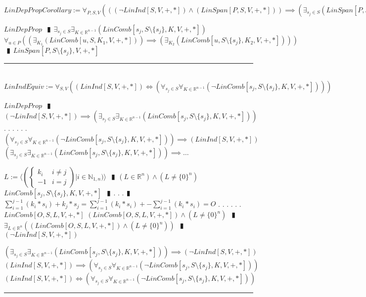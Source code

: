 \documentclass{book}
\newcommand{\abr}{:=}
\newcommand{\cont}{\phantom{.}. . .\phantom{.}}
\newcommand{\pipe}{$\phantom{(}\vrectangleblack\phantom{)}$}
\newcommand{\pr}[1]{\left(#1\right)}
\begin{document}
$LinDepPropCorollary \abr \forall_{P, S, V}\pr{\pr{(\lnot LinInd[S, V, +, *]) \land (LinSpan[P, S, V, +, *])} \implies \pr{\exists_{s_j \in S}(LinSpan[P, S \setminus \{s_j\}, V, +, *])}}$
\begin{enumerate}
  \lit $LinDepProp$ \pipe $\exists_{s_j \in S} \exists_{K \in \mathbb{R}^{n - 1}}(LinComb[s_j, S \setminus \{s_j\}, K, V, +, *])$
  \lit $\forall_{u \in P}\pr{\pr{\exists_{K_1}(LinComb[u, S, K_1, V, +, *])} \implies \pr{\exists_{K_2}(LinComb[u, S \setminus \{s_j\}, K_2, V, +, *])}}$ \pipe $LinSpan[P, S \setminus \{s_j\}, V, +, *]$
\end{enumerate} \vspace{.75mm} \hrule \vspace{.75mm} \ \\ 

$LinIndEquiv \abr \forall_{S, V}\pr{(LinInd[S, V, +, *]) \iff \pr{\forall_{s_j \in S} \forall_{K \in \mathbb{R}^{n - 1}}(\lnot LinComb[s_j, S \setminus \{s_j\}, K, V, +, *])}}$
\begin{enumerate}
  \lit $LinDepProp$ \pipe $(\lnot LinInd[S, V, +, *]) \implies \pr{\exists_{s_j \in S} \exists_{K \in \mathbb{R}^{n - 1}}(LinComb[s_j, S \setminus \{s_j\}, K, V, +, *])}$ \cont
  \lit \cont $\pr{\forall_{s_j \in S} \forall_{K \in \mathbb{R}^{n - 1}}(\lnot LinComb[s_j, S \setminus \{s_j\}, K, V, +, *])} \implies (LinInd[S, V, +, *])$
  \lit $\pr{\exists_{s_j \in S} \exists_{K \in \mathbb{R}^{n - 1}}(LinComb[s_j, S \setminus \{s_j\}, K, V, +, *])} \implies \ldots$
  \begin{enumerate}
    \lit $L \abr \langle \left(\begin{cases} 
      k_i & i \neq j \\
      -1 & i = j 
    \end{cases}\right) | i \in \mathbb{N}_{1, n}) \rangle$ \pipe $(L \in \mathbb{R}^n) \land (L \neq \{0\}^n)$
    \lit $LinComb[s_j, S \setminus \{s_j\}, K, V, +, *]$ \pipe \cont  \pipe $\sum_{i = 1}^{j - 1}(k_i * s_i) + k_j * s_j = \sum_{i = 1}^{j - 1}(k_i * s_i) + -\sum_{i = 1}^{j - 1}(k_i * s_i) = O$ \cont
    \lit \cont $LinComb[O, S, L, V, +, *]$
    \lit $(LinComb[O, S, L, V, +, *]) \land (L \neq \{0\}^n)$ \pipe $\exists_{L \in \mathbb{R}^n}\pr{(LinComb[O, S, L, V, +, *]) \land (L \neq \{0\}^n)}$ \pipe $(\lnot LinInd[S, V, +, *])$
  \end{enumerate}
  \lit $\pr{\exists_{s_j \in S} \exists_{K \in \mathbb{R}^{n - 1}}(LinComb[s_j, S \setminus \{s_j\}, K, V, +, *])} \implies (\lnot LinInd[S, V, +, *])$
  \lit $(LinInd[S, V, +, *]) \implies \pr{\forall_{s_j \in S} \forall_{K \in \mathbb{R}^{n - 1}}(\lnot LinComb[s_j, S \setminus \{s_j\}, K, V, +, *])}$
  \lit $(LinInd[S, V, +, *]) \iff \pr{\forall_{s_j \in S} \forall_{K \in \mathbb{R}^{n - 1}}(\lnot LinComb[s_j, S \setminus \{s_j\}, K, V, +, *])}$
\end{enumerate} \vspace{.75mm} \hrule \vspace{.75mm} \ \\ 
\end{document}
